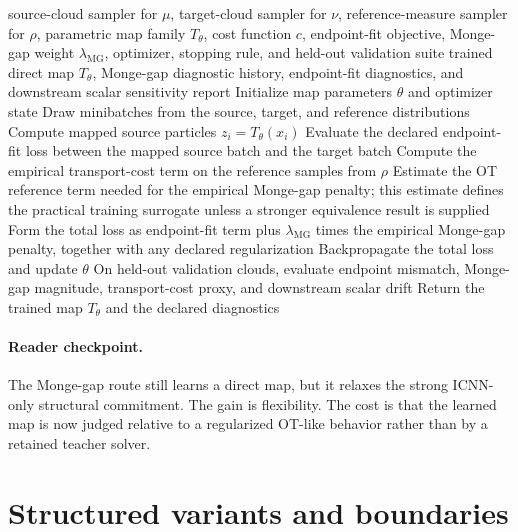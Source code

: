 \begin{algorithm}[ht]
\caption{\texttt{train\_monge\_gap\_regularized\_direct\_map}}
\begin{algorithmic}[1]
\Require source-cloud sampler for \(\mu\), target-cloud sampler for \(\nu\), reference-measure sampler for \(\rho\), parametric map family \(T_\theta\), cost function \(c\), endpoint-fit objective, Monge-gap weight \(\lambda_{\mathrm{MG}}\), optimizer, stopping rule, and held-out validation suite
\Ensure trained direct map \(T_\theta\), Monge-gap diagnostic history, endpoint-fit diagnostics, and downstream scalar sensitivity report
\State Initialize map parameters \(\theta\) and optimizer state
  \State Draw minibatches from the source, target, and reference distributions
  \State Compute mapped source particles \(z_i=T_\theta(x_i)\)
  \State Evaluate the declared endpoint-fit loss between the mapped source batch and the target batch
  \State Compute the empirical transport-cost term on the reference samples from \(\rho\)
  \State Estimate the OT reference term needed for the empirical Monge-gap penalty; this estimate defines the practical training surrogate unless a stronger equivalence result is supplied
  \State Form the total loss as endpoint-fit term plus \(\lambda_{\mathrm{MG}}\) times the empirical Monge-gap penalty, together with any declared regularization
  \State Backpropagate the total loss and update \(\theta\)
\EndWhile
  \State On held-out validation clouds, evaluate endpoint mismatch, Monge-gap magnitude, transport-cost proxy, and downstream scalar drift
  \State Return the trained map \(T_\theta\) and the declared diagnostics
\end{algorithmic}
\end{algorithm}

\paragraph{Reader checkpoint.}
The Monge-gap route still learns a direct map, but it relaxes the strong
ICNN-only structural commitment.  The gain is flexibility.  The cost is that
the learned map is now judged relative to a regularized OT-like behavior rather
than by a retained teacher solver.

\section{Structured variants and boundaries}
\label{sec:bf-neural-ot-direct-structured}
\label{sec:bf-neural-ot-direct-scalable-boundary}

